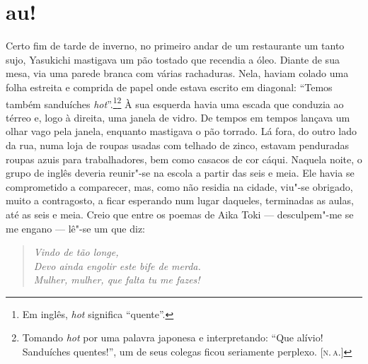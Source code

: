 \section*{au!}

\noindent{}Certo fim de tarde de inverno, no primeiro andar de um restaurante um
tanto sujo, Yasukichi mastigava um pão tostado que recendia a óleo.
Diante de sua mesa, via uma parede branca com várias rachaduras. Nela,
haviam colado uma folha estreita e comprida de papel onde estava
escrito em diagonal: ``Temos também sanduíches \textit{hot}''.\footnote{Em inglês, \textit{hot} significa ``quente''.}\footnote{Tomando \textit{hot} por uma palavra japonesa e interpretando: ``Que alívio! Sanduíches quentes!'', um de seus colegas ficou seriamente perplexo. [\textsc{n.\,a.}]} À
sua esquerda havia uma escada que conduzia ao térreo e, logo à direita,
uma janela de vidro. De tempos em tempos lançava um olhar vago pela
janela, enquanto mastigava o pão torrado. Lá fora, do outro lado da
rua, numa loja de roupas usadas com telhado de zinco, estavam
penduradas roupas azuis para trabalhadores, bem como casacos de cor
cáqui. Naquela noite, o grupo de inglês deveria reunir"-se na escola a
partir das seis e meia. Ele havia se comprometido a comparecer,
mas, como não residia na cidade, viu"-se obrigado, muito a
contragosto, a ficar esperando num lugar daqueles, terminadas as aulas,
até as seis e meia. Creio que entre os poemas de Aika Toki --- 
desculpem"-me se me engano --- lê"-se um que diz:

\begin{verse}
\textit{Vindo de tão longe,\\
Devo ainda engolir este bife de merda.\\
Mulher, mulher, que falta tu me fazes!}
\end{verse}

